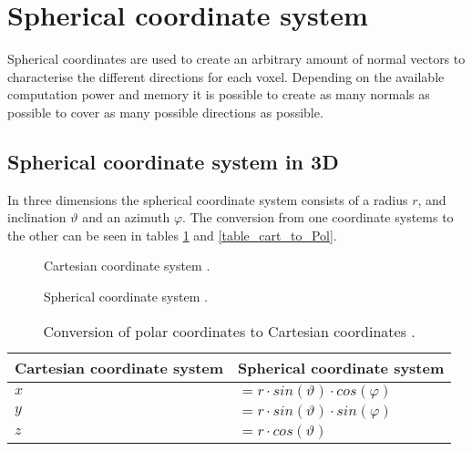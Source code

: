 \section{Spherical coordinate system}
Spherical coordinates are used to create an arbitrary amount of normal vectors to characterise the different directions for each voxel. Depending on the available computation power and memory it is possible to create as many normals as possible to cover as many possible directions as possible.


\subsection{Spherical coordinate system in 3D}

In three dimensions the spherical coordinate system consists of a radius $r$, and inclination $\vartheta$ and an azimuth $\varphi$. The conversion from one coordinate systems to the other can be seen in tables \ref{table_pol_to_cart} and \ref{table_cart_to_Pol}.

\begin{figure}[H]
  \centering
  \begin{minipage}[b]{0.45\textwidth}
    \centering
  \caption{Cartesian coordinate system \cite{Prof.Dr.-Ing.GertF.Trommer2013FelderWellen}.}
  \end{minipage}
  \hfill
  \begin{minipage}[b]{0.45\textwidth}
    \centering
  \caption{Spherical coordinate system \cite{Prof.Dr.-Ing.GertF.Trommer2013FelderWellen}.}
  \end{minipage}
    \hfill
\label{polar_cart_systems}
\end{figure}




\begin{table}[H]
\centering
\begin{tabular}{|ll|}
\hline
\textbf{Cartesian coordinate system} & \textbf{Spherical coordinate system}                                                                            \\ \hline
$x $                            & $= r \cdot sin(\vartheta) \cdot cos(\varphi)$ \\
$y $                            & $= r \cdot sin(\vartheta) \cdot sin(\varphi)$ \\
$z $                            & $= r \cdot cos(\vartheta)$                                                  \\ \hline
\end{tabular}
\caption{Conversion of polar coordinates to Cartesian coordinates  \cite{Bronstein2005TaschenbuchMathematik}.}
\label{table_pol_to_cart}
\end{table}


